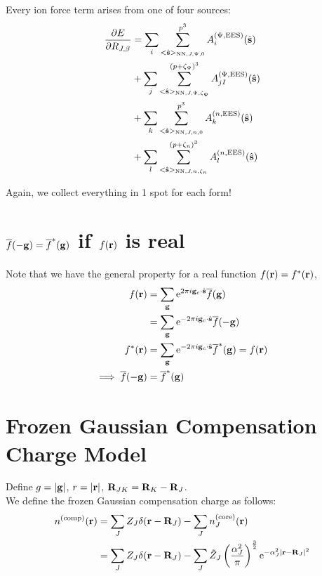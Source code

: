 \documentclass[paper=a4, fontsize=11pt]{article} %
\numberwithin{equation}{section} %
\numberwithin{figure}{section} %
\numberwithin{table}{section} %
\newcommand{\p}{\partial}
\newcommand{\ol}{\overline}
\newcommand{\bs}{{\bf{s}}}
\newcommand{\bg}{{\bf{g}}}
\newcommand{\br}{{\bf{r}}}
\newcommand{\bR}{{\bf{R}}}
\newcommand{\hs}{{\hat{\bf{s}}}}
\newcommand{\rEES}{{\mathrm{EES}}}
\newcommand{\rcore}{{\mathrm{core}}}
\newcommand{\rNN}{{\mathrm{NN}}}
\newcommand{\re}{{\mathrm{e}}}
\newcommand{\rcomp}{{\mathrm{comp}}}
\newcommand{\gc}{{\bg_c}}
\newcommand{\igcs}{2\pi i\gc\cdot\hat \bs}
\newcommand{\al}{{\alpha}}
\newcommand{\RJb}{{R_{J,\beta}}}
\newcommand{\pzp}{{(p+\zeta_{\Psi})^3}}
\newcommand{\pzn}{{(p+\zeta_n)^3}}
\newcommand{\hsJp}{{<\hs>_{\rNN,J,\Psi,\zeta_\Psi}}}
\newcommand{\hsJn}{{<\hs>_{\rNN,J,n,\zeta_n}}}
\newcommand{\hsJpzr}{{<\hs>_{\rNN,J,\Psi,0}}}
\newcommand{\hsJnzr}{{<\hs>_{\rNN,J,n,0}}}
\begin{document}
Every ion force term arises from one of four sources:
\begin{equation}
\begin{split}
\frac{\p E}{\p \RJb} &= \sum_i \sum_{\hsJpzr}^{p^3} A_i^{(\Psi,\rEES)}(\hs)\\
&+ \sum_j \sum_{\hsJp}^{\pzp} A_{jI}^{(\Psi,\rEES)}(\hs)\\
&+ \sum_k \sum_{\hsJnzr}^{p^3} A_k^{(n,\rEES)}(\hs)\\
&+ \sum_l \sum_{\hsJn}^{\pzn} A_l^{(n,\rEES)}(\hs)\\
\end{split}
\end{equation}

Again, we collect everything in 1 spot for each form!

\newpage
\section{$\ol f(-\bg) =  \ol f^*(\bg)$ if $f(\br)$ is real}\label{App:freal}
Note that we have the general property for a real function $f(\br) = f^*(\br)$,
\begin{equation}
\begin{split}
f(\br) &= \sum_\bg \re^{\igcs} \ol f(\bg) \\
&= \sum_\bg \re^{-\igcs} \ol f(-\bg) \\
f^*(\br) &= \sum_\bg \re^{-\igcs} \ol f^*(\bg) = f(\br) \\
\implies \ol f(-\bg) &=  \ol f^*(\bg) 
\end{split}
\end{equation}

\newpage
\section{Frozen Gaussian Compensation Charge Model}\label{App:Compc}

Define $g=|\bg|$, $r=|\br|$, $\bR_{JK} = \bR_K - \bR_J$.\\

We define the frozen Gaussian compensation charge as follows:
\begin{equation}
\begin{split}
n^{(\rcomp)}(\br) 
&= \sum_J Z_J\delta(\br-\bR_J) - \sum_J n_J^{(\rcore)}(\br)\\
&= \sum_J Z_J\delta(\br-\bR_J) - \sum_J \tilde Z_J\left(\frac{\al_J^2}{\pi}\right)^{\frac{3}{2}}\re^{-\al_J^2|\br-\bR_J|^2}
\end{split}
\end{equation}
\end{document}
